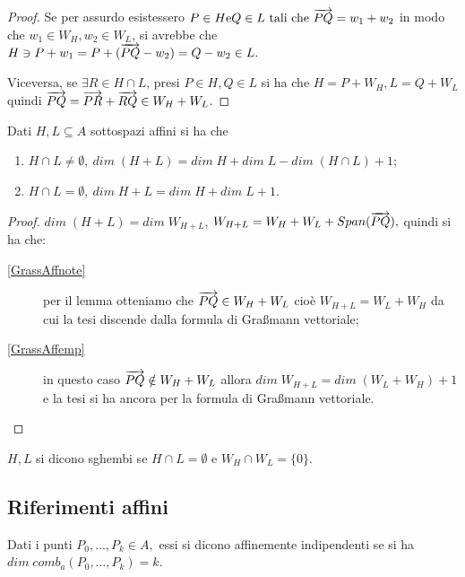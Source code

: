  \begin{proof}
 Se per assurdo esistessero $P\in H \text{e} Q\in L \text{ tali che } \overrightarrow{PQ}=w_1+w_2$ in modo che
 $w_1\in W_H, w_2\in W_L$, si avrebbe che $H \ni P+w_1 = P+(\overrightarrow{PQ}-w_2) = Q - w_2 \in L.$
 
 Viceversa, se $\exists R \in H \cap L$, presi $P\in H, Q \in L$ si ha che $H=P+W_H,L=Q+W_L$ quindi
 $\overrightarrow{PQ}=\overrightarrow{PR}+\overrightarrow{RQ}\in W_H+W_L$.
 \end{proof}
 
 \begin{proposition}
Dati $H,L\subseteq A$ sottospazi affini si ha che
 \begin{enumerate}[label=\bf\Roman*)]
	\item $H\cap L \neq \emptyset, \ dim\;(H+L)=dim\;H+dim\;L-dim\;(H\cap L)+1$;\label{GrassAffnote}
	\item $H\cap L = \emptyset, \ dim\;{H+L}=dim\;H+dim\;L+1$.\label{GrassAffemp}
 \end{enumerate}
 \end{proposition}
 
 \begin{proof}
  $dim\;(H+L)= dim\;W_{H+L}$, $W_{H+L}=W_H+W_L+Span(\overrightarrow{PQ}),$ quindi si ha che:
 \begin{description}
	\item[\ref{GrassAffnote}] per il lemma otteniamo che $\overrightarrow{PQ}\in W_H+W_L$ cioè $W_{H+L}=W_L+W_H$
		da cui la tesi discende dalla formula di Gra\ss mann vettoriale;
	\item[\ref{GrassAffemp}] in questo caso $\overrightarrow{PQ}\notin W_H+W_L$ allora $dim\;W_{H+L}=dim\;(W_L+W_H)+1$
		e la tesi si ha ancora per la formula di Gra\ss mann vettoriale.
 \end{description}
 \end{proof}

 \begin{definition}
  $H,L$ si dicono sghembi se  $H\cap L = \emptyset$ e $W_H \cap W_L = \{0\}$.
 \end{definition}
 
	\subsection{Riferimenti affini}
 
 \begin{definition}
 Dati i punti $P_0,\dots, P_k\in A,$ essi si dicono affinemente indipendenti se si ha
 $dim\;comb_a(P_0,\dots,P_k)=k$.
 \end{definition}
 
